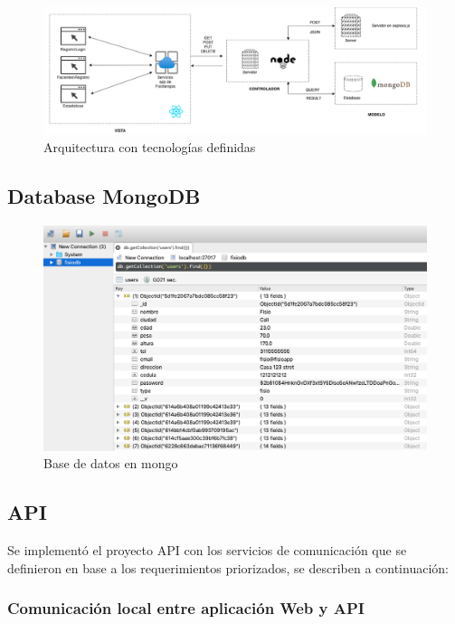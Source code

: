 \documentclass[12pt]{article}
\begin{document}
\begin{figure}[ht]
\centering
\includegraphics[scale=0.36]{imag/React1.png}
\caption{Arquitectura con tecnologías definidas }
\label{6}
\end{figure}
\FloatBarrier





\subsection{Database MongoDB}

\begin{figure}[ht]
\centering
\includegraphics[scale=0.36]{imag/databasemongo.png}
\caption{Base de datos en mongo }
\label{6}
\end{figure}
\FloatBarrier





\subsection{API}

Se implementó el proyecto API con los servicios de comunicación que se definieron en base a los requerimientos priorizados, se describen a continuación: 


\subsubsection{Comunicación local entre aplicación Web y API}
\end{document}
